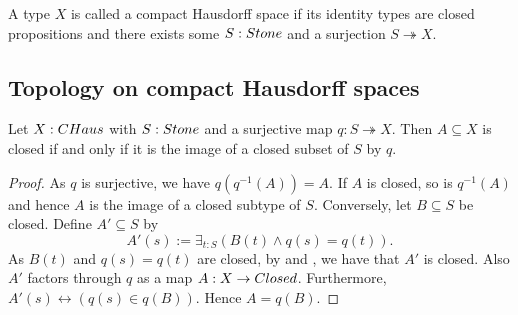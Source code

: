 \begin{definition}
  A type $X$ is called a compact Hausdorff space if its identity types are closed propositions and there exists some $S:\Stone$ and a surjection $S\twoheadrightarrow X$.
\end{definition}


\subsection{Topology on compact Hausdorff spaces}

\begin{lemma}\label{CompactHausdorffClosed}
  Let $X:\CHaus$ with $S:\Stone$ and a surjective map $q:S\twoheadrightarrow X$.
  Then $A\subseteq X$ is closed if and only if it is the image of a closed subset of $S$ by $q$. 
\end{lemma}
\begin{proof}
  As $q$ is surjective, we have $q(q^{-1}(A)) = A$.
  If $A$ is closed, so is $q^{-1}(A)$ and 
  hence $A$ is the image of a closed subtype of $S$. 
  Conversely, let $B\subseteq S$ be closed. 
  Define $A'\subseteq S$ by 
  $$A'(s) := \exists_{t:S} (B(t) \wedge q(s) = q(t)).$$
  As $B(t)$ and $q(s) = q(t)$ are closed, by  and , 
  we have that $A'$ is closed. 
  Also $A'$ factors through $q$ as a map $A: X\to \Closed$.
  Furthermore, $A'(s) \leftrightarrow (q(s)\in q(B))$. 
  Hence $A=q(B)$. 
\end{proof}

